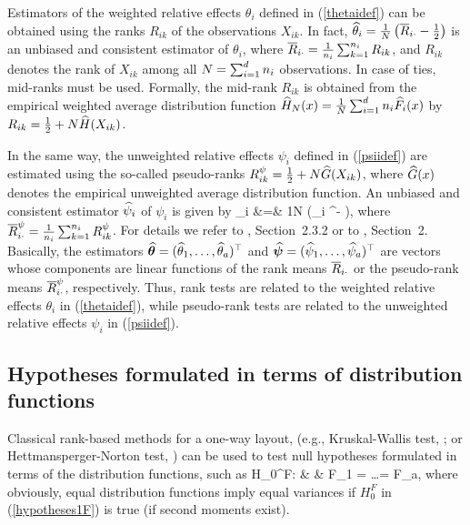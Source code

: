 Estimators of the weighted relative effects $\theta_i$ defined in 
(\ref{thetaidef}) can be obtained using the ranks $R_{ik}$ of the observations 
$X_{ik}$. In fact, $\widehat{\theta}_i=\frac1N \left( \overline{R}_{i \cdot} - \frac12 \right)$ is an 
unbiased and consistent estimator of $\theta_i$, where 
$\overline{R}_{i \cdot} = \frac1{n_i} \sum_{k=1}^ {n_i} R_{ik}$, and $R_{ik}$ denotes the rank 
of $X_{ik}$ among all $N=\sum_{i=1}^ d n_i$ observations. In case of ties, mid-ranks 
must be used. Formally, the mid-rank $R_{ik}$ is obtained from the empirical 
weighted average distribution function $\widehat{H}_N(x) =\frac1N \sum_{i=1}^ d n_i \widehat{F}_i(x)$ 
by $R_{ik} = \frac12 + N \widehat{H}(X_{ik})$. 

In the same way, the unweighted relative effects $\psi_i$ defined in 
(\ref{psiidef}) are estimated using the so-called pseudo-ranks $R_{ik}^\psi = 
\frac12 + N \widehat{G}(X_{ik})$, where $\widehat{G}(x)$ denotes the empirical unweighted 
average distribution function. An unbiased and consistent estimator $\widehat{\psi}_i$ 
of $\psi_i$ is given by 
\bqan 
 \hpsi_i &=& \frac1N \left(\olR_{i \cdot}^\psi -  \right), 
             \label{psihdef}
\eqan 
where $\overline{R}_{i \cdot}^\psi = \frac1{n_i} \sum_{k=1}^ {n_i} R_{ik}^\psi$. For details 
we refer to \cite{brunner2019rank}, Section~2.3.2 or to \cite{happ2020pseudo}, 
Section~2. Basically, the estimators $\boldsymbol{\widehat{\theta}} = (\widehat{\theta}_1, \ldots, 
\widehat{\theta}_a)^\top$ and $\boldsymbol{\widehat{\psi}} = (\widehat{\psi}_1, \ldots, \widehat{\psi}_a)^\top$ are vectors whose
components are linear functions of the rank means $\overline{R}_{i \cdot}$ 
or the pseudo-rank means $\overline{R}_{i \cdot}^\psi$, respectively. Thus, rank tests 
are related to the weighted relative effects $\theta_i$ in (\ref{thetaidef}), 
while pseudo-rank tests are related to the unweighted relative effects $\psi_i$ 
in (\ref{psiidef}).


\subsection{Hypotheses formulated in terms of distribution functions} \label{hypF}

Classical rank-based methods for a one-way layout, (e.g., Kruskal-Wallis test, 
\cite{kruskal1952nonparametric, kruskal1952use}; or Hettmansperger-Norton test, \cite{hettmansperger1987tests}) 
can be used to test null hypotheses formulated in terms of the distribution functions, such as 
\bqan 
H_0^F: & & F_1 = \ldots = F_a,  \label{hypotheses1F}
\eqan
where obviously, equal distribution functions imply equal variances if $H_0^F$ 
in (\ref{hypotheses1F}) is true (if second moments exist).

